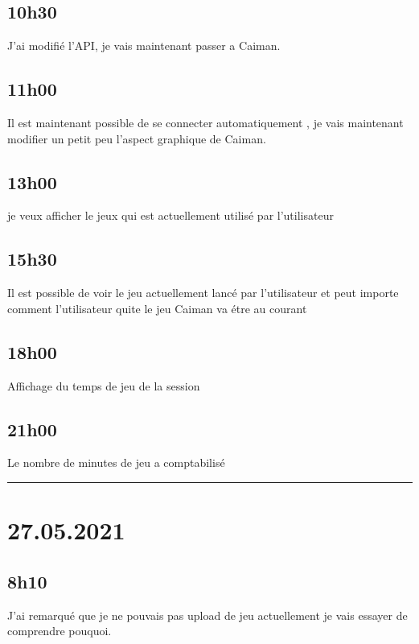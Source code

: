 \documentclass[a4paper,12pt,french]{sphinxmanual}
\begin{document}
\subsection{10h30}
\label{\detokenize{logbook:id157}}
\sphinxAtStartPar
J’ai modifié l’API, je vais maintenant passer a Caiman.


\subsection{11h00}
\label{\detokenize{logbook:id158}}
\sphinxAtStartPar
Il est maintenant possible de se connecter automatiquement , je vais maintenant modifier un petit peu l’aspect graphique de Caiman.


\subsection{13h00}
\label{\detokenize{logbook:id159}}
\sphinxAtStartPar
je veux afficher le jeux qui est actuellement utilisé par l’utilisateur


\subsection{15h30}
\label{\detokenize{logbook:id160}}
\sphinxAtStartPar
Il est possible de voir le jeu actuellement lancé par l’utilisateur et peut importe comment l’utilisateur quite le jeu Caiman va étre au courant


\subsection{18h00}
\label{\detokenize{logbook:id161}}
\sphinxAtStartPar
Affichage du temps de jeu de la session


\subsection{21h00}
\label{\detokenize{logbook:id162}}
\sphinxAtStartPar
Le nombre de minutes de jeu a comptabilisé


\bigskip\hrule\bigskip



\section{27.05.2021}
\label{\detokenize{logbook:id163}}

\subsection{8h10}
\label{\detokenize{logbook:id164}}
\sphinxAtStartPar
J’ai remarqué que je ne pouvais pas upload de jeu actuellement je vais essayer de comprendre pouquoi.
\end{document}

